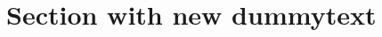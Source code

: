     \section{Section with new dummytext}
    \Blindtext[2][4]




%           
%           
%           
%           
%           
% 
%
%
% 
%
%
% 
%
%
% 
%
%
% 
%
%
% 
%
%
% 
